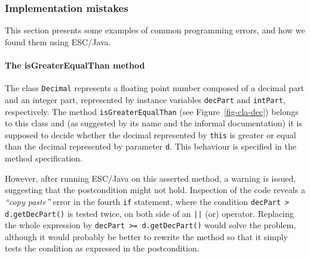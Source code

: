 \documentclass[a4paper]{llncs}
\begin{document}
\subsubsection{Implementation mistakes}
This section presents some examples of common programming
errors, and how we found them using ESC/Java.



\paragraph{The isGreaterEqualThan method}


The class \texttt{Decimal} 
represents a floating point number 
composed of a decimal part and an integer part,
represented by instance variables \texttt{decPart}
and \texttt{intPart}, respectively. The
method \texttt{isGreaterEqualThan} (see Figure~\ref{fig-cla-dec})
belongs to this class and (as suggested by its name and the informal
documentation) it is supposed to decide whether the
decimal represented by \texttt{this} is greater or equal than the
decimal represented by parameter
\texttt{d}. This behaviour is specified in the method specification.

However, after running ESC/Java on this asserted method, a warning is
issued, suggesting that the postcondition
might not hold. Inspection of the code reveals a
\emph{``copy paste''} error in the fourth \texttt{if} statement, where 
the condition \texttt{decPart > d.getDecPart()}
is tested twice, on both side of an \texttt{||}
(or) operator. Replacing the whole expression
by \texttt{decPart >= d.getDecPart()} would solve the problem,
although it would probably be better to rewrite the method so that it
simply tests the condition as expressed in the postcondition.
\end{document}
